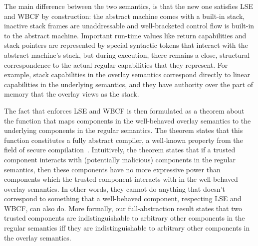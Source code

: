 \documentclass[acmsmall,screen]{acmart}\settopmatter{}
\begin{document}
The main difference between the two semantics, is that the new one satisfies LSE and WBCF by construction: the abstract machine comes with a built-in stack, inactive stack frames are unaddressable and well-bracketed control flow is built-in to the abstract machine.
Important run-time values like return capabilities and stack pointers are represented by special syntactic tokens that interact with the abstract machine's stack, but during execution, there remains a close, structural correspondence to the actual regular capabilities that they represent.
For example, stack capabilities in the overlay semantics correspond directly to linear capabilities in the underlying semantics, and they have authority over the part of memory that the overlay views as the stack.

The fact that \stktokens{} enforces LSE and WBCF is then formulated as a theorem about the function that maps components in the well-behaved overlay semantics to the underlying components in the regular semantics.
The theorem states that this function constitutes a fully abstract compiler, a well-known property from the field of secure compilation~\cite{abadi_protection_1999}.
Intuitively, the theorem states that if a trusted component interacts with (potentially malicious) components in the regular semantics, then these components have no more expressive power than components which the trusted component interacts with in the well-behaved overlay semantics.
In other words, they cannot do anything that doesn't correspond to something that a well-behaved component, respecting LSE and WBCF, can also do.
More formally, our full-abstraction result states that two trusted components are indistinguishable to arbitrary other components in the regular semantics iff they are indistinguishable to arbitrary other components in the overlay semantics.
\end{document}
